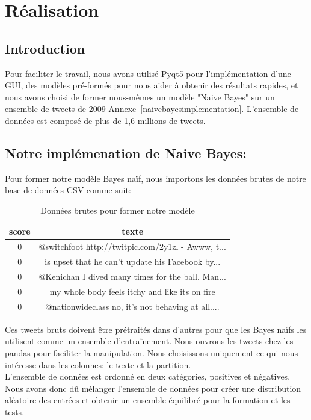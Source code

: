 \chapter{Réalisation}
\section{Introduction}
Pour faciliter le travail, nous avons utilisé Pyqt5 pour l'implémentation d'une GUI, des modèles pré-formés pour nous aider à obtenir des résultats rapides, et nous avons choisi de former nous-mêmes un modèle "Naive Bayes" sur un ensemble de tweets de 2009 Annexe~\ref{naivebayesimplementation}. L'ensemble de données est composé de plus de 1,6 millions de tweets.
\section{Notre implémenation de Naive Bayes:} 
Pour former notre modèle Bayes naïf, nous importons les données brutes de notre base de données CSV comme suit:\\
\begin{table}[h!]
\centering
    \begin{tabular}{|c|c|} 
    \hline
    score & texte \\ [0.5ex] 
    \hline\hline
    0 & @switchfoot http://twitpic.com/2y1zl - Awww, t... \\ 
    \hline
    0 & is upset that he can't update his Facebook by... \\
    \hline
    0 & @Kenichan I dived many times for the ball. Man... \\
    \hline
    0 & my whole body feels itchy and like its on fire \\
    \hline
    0 & @nationwideclass no, it's not behaving at all.... \\ [0.5ex] 
    \hline
   \end{tabular}
   \caption{Données brutes pour former notre modèle}
   \label{table:1}
\end{table}
Ces tweets bruts doivent être prétraités dans d'autres pour que les Bayes naïfs les utilisent comme un ensemble d'entraînement. Nous ouvrons les tweets chez les pandas pour faciliter la manipulation. Nous choisissons uniquement ce qui nous intéresse dans les colonnes: le texte et la partition.\\

L'ensemble de données est ordonné en deux catégories, positives et négatives. Nous avons donc dû mélanger l'ensemble de données pour créer une distribution aléatoire des entrées et obtenir un ensemble équilibré pour la formation et les tests.\\

